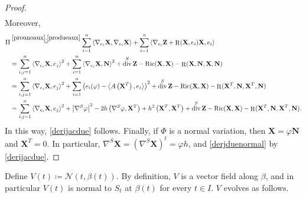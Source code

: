 \documentclass[11pt]{amsart}
\newcommand{\n}[1]{\nabla^\varepsilon_{ #1 }}
\newcommand{\N}{\mathcal N}
\newcommand{\X}{\mathbf{X}}
\newcommand{\Z}{\mathbf{Z}}
\renewcommand{\n}{\mathbf{N}}
\DeclareMathOperator{\ric}{Ric}
\DeclareMathOperator{\divv}{div}
\DeclareMathOperator{\R}{R}
\theoremstyle{definition}
\theoremstyle{remark}
\numberwithin{equation}{section}
\begin{document}
\begin{proof}
\begin{equation*}
\begin{split}
        \end{split}
    \end{equation*}
    Moreover,
    \begin{equation*}
        \begin{split}
            \mathrm{II}&\overset{\eqref{prounoaux},\eqref{produeaux}}{=}\sum_{i=1}^n\left\langle \nabla_{e_i}\X,\nabla_{e_i}\X\right\rangle+\sum_{i=1}^n\left\langle\nabla_{e_i}\Z+\R(\X,e_i)\X,e_i\right\rangle\\
            &=\sum_{i,j=1}^n\left\langle \nabla_{e_i}\X,e_j\right\rangle^2+\sum_{i=1}^n\left\langle \nabla_{e_i}\X,\n\right\rangle^2+\divv^S\Z-\ric(\X,\X)-\R(\X,\n,\X,\n)\\
            &=\sum_{i,j=1}^n\left\langle \nabla_{e_i}\X,e_j\right\rangle^2+\sum_{i=1}^n\left(e_i(\varphi)-\left\langle A\left(\X^T\right),e_i\right\rangle\right)^2+\divv^S\Z-\ric(\X,\X)-\R(\X^T,\n,\X^T,\n)\\
            &=\sum_{i,j=1}^n\left\langle \nabla_{e_i}\X,e_j\right\rangle^2+\left|\nabla^S\varphi\right|^2-2h\left(\nabla^S\varphi,\X^T\right)+h^2\left(\X^T,\X^T\right)+\divv^S\Z-\ric(\X,\X)-\R(\X^T,\n,\X^T,\n).\\
        \end{split}
    \end{equation*}
    In this way, \eqref{derijacdue} follows. Finally, if $\Phi$ is a normal variation, then $\X=\varphi\n$ and $\X^T=0$. In particular, $\nabla^S\X=\left(\nabla^S\X\right)^t=\varphi h$, and \eqref{derjduenormal} by \eqref{derijacdue}.
\end{proof}
Define $V(t)\coloneqq \N(t,\beta(t))$. By definition, $V$ is a vector field along $\beta$, and in particular $V(t)$ is normal to $S_t$ at $\beta(t)$ for every $t\in I$. $V$ evolves as follows.
\end{document}
